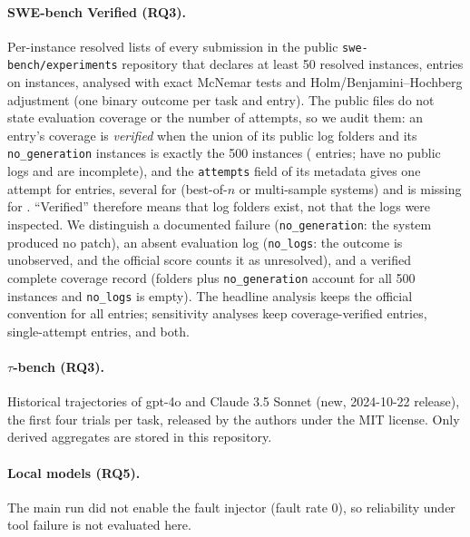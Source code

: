 \paragraph{SWE-bench Verified (RQ3).} Per-instance resolved lists of every submission in the public \texttt{swe-bench/experiments} repository that declares at least 50 resolved instances, \sweNAgents{} entries on \sweNTasks{} instances, analysed with exact McNemar tests and Holm/Benjamini--Hochberg adjustment (one binary outcome per task and entry). The public files do not state evaluation coverage or the number of attempts, so we audit them: an entry's coverage is \emph{verified} when the union of its public log folders and its \texttt{no\_generation} instances is exactly the 500 instances (\sweNCovered{} entries; \sweNUnverif{} have no public logs and \sweNIncomplete{} are incomplete), and the \texttt{attempts} field of its metadata gives one attempt for \sweNSingle{} entries, several for \sweNMulti{} (best-of-$n$ or multi-sample systems) and is missing for \sweNAttUnknown. ``Verified'' therefore means that log folders exist, not that the logs were inspected. We distinguish a documented failure (\texttt{no\_generation}: the system produced no patch), an absent evaluation log (\texttt{no\_logs}: the outcome is unobserved, and the official score counts it as unresolved), and a verified complete coverage record (folders plus \texttt{no\_generation} account for all 500 instances and \texttt{no\_logs} is empty). The headline analysis keeps the official convention for all entries; sensitivity analyses keep coverage-verified entries, single-attempt entries, and both.

\paragraph{$\tau$-bench (RQ3).} Historical trajectories of gpt-4o and Claude 3.5 Sonnet (new, 2024-10-22 release), the first four trials per task, released by the authors under the MIT license. Only derived aggregates are stored in this repository.

\paragraph{Local models (RQ5).} \REALPROTOCOL{} The main run did not enable the fault injector (fault rate 0), so reliability under tool failure is not evaluated here.
